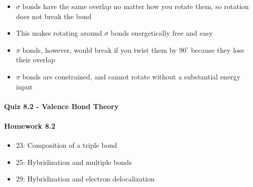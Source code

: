 \documentclass[12pt, openany, letterpaper]{memoir}
\begin{document}
\begin{itemize}
\begin{itemize}
      \item $\sigma$ bonds have the same overlap no matter how you rotate them, so rotation does not break the bond
      \item This makes rotating around $\sigma$ bonds energetically free and easy
      \item $\pi$ bonds, however, would break if you twist them by $90^\circ$ because they lose their overlap
      \item $\pi$ bonds are constrained, and cannot rotate without a substantial energy input
    \end{itemize}
\end{itemize}

\paragraph*{Quiz 8.2 - Valence Bond Theory}
\paragraph*{Homework 8.2}
\begin{itemize}
  \item 23: Composition of a triple bond
  \item 25: Hybridization and multiple bonds
  \item 29: Hybridization and electron delocalization
\end{itemize}
\end{document}
